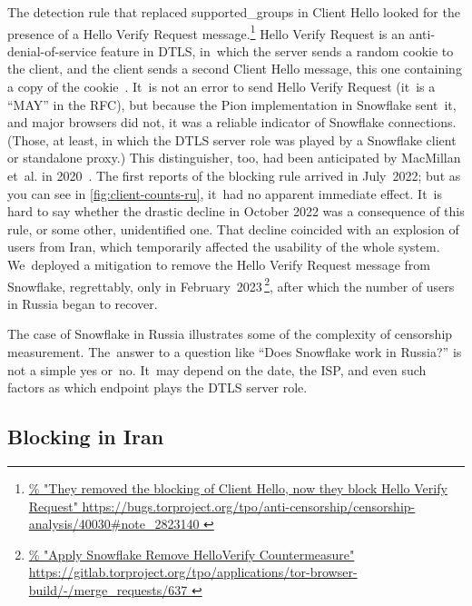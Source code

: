 \documentclass[letterpaper,twocolumn]{article}
\newlength{\urlfootnotesize}
\newcommand{\urlfootnote}[1]{\footnote{
\raggedright\hangindent\footnotemargin%
\fontsize{\urlfootnotesize}{\urlfootnotesize}\selectfont%
\url{#1}
}}
\begin{document}
The detection rule that replaced \mbox{supported\_groups} in Client Hello
looked for the presence of a Hello Verify Request message.\urlfootnote{
https://bugs.torproject.org/tpo/anti-censorship/censorship-analysis/40030\#note_2823140
}
Hello Verify Request is an anti-denial-of-service feature in DTLS,
in~which the server sends a random cookie to the client,
and the client sends a second Client Hello message,
this one containing a copy of the cookie~\cite[\S 5.1]{rfc9147}.
It~is not an error to send Hello Verify Request
(it~is a ``MAY'' in the RFC),
but because the Pion implementation in Snowflake sent~it,
and major browsers did not,
it was a reliable indicator of Snowflake connections.
(Those, at least, in which the DTLS server role was played by
a Snowflake client or standalone proxy.)
This distinguisher, too, had been anticipated by
MacMillan et~al. in 2020~\cite[\S 3]{arxiv.2008.03254}.
The first reports of the blocking rule arrived in July~2022;
but as you can see in \autoref{fig:client-counts-ru},
it~had no apparent immediate effect.
It~is hard to say whether the drastic decline in October 2022
was a consequence of this rule,
or some other, unidentified one.
That decline coincided with an explosion of users from Iran,
which temporarily affected the usability of the whole system.
We~deployed a mitigation to remove the Hello Verify Request message
from Snowflake, regrettably, only in February~2023\,\urlfootnote{
https://gitlab.torproject.org/tpo/applications/tor-browser-build/-/merge_requests/637
}, %
after which the number of users in Russia began to recover.

The case of Snowflake in Russia illustrates
some of the complexity of censorship measurement.
The~answer to a question like ``Does Snowflake work in Russia?''
is not a simple yes or~no.
It~may depend on the date, the ISP,
and even such factors as which endpoint plays the DTLS server role.

\subsection{Blocking in Iran}
\label{sec:block-ir}

\end{document}
